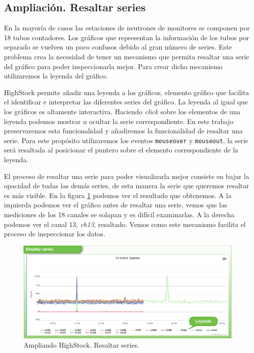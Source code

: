 	\subsection{Ampliación. Resaltar series}
		En la mayoría de casos las estaciones de neutrones de monitores se componen por 18 tubos contadores. Los gráficos que representan la
		información de los tubos por separado se vuelven un poco confusos debido al gran número de series. Este problema crea la necesidad de
		tener un mecanismo que permita resaltar una serie del gráfico para poder inspeccionarla mejor. Para crear dicho mecanismo utilizaremos
		la leyenda del gráfico.
		\par
		HighStock permite añadir una leyenda a los gráficos, elemento gráfico que facilita el identificar e interpretar las diferentes series
		del gráfico. La leyenda al igual que los gráficos es altamente interactiva. Haciendo \emph{click} sobre los elementos de una leyenda
		podemos mostrar u ocultar la serie correspondiente. En este trabajo preservaremos esta funcionalidad y añadiremos la funcionalidad de
		resaltar una serie. Para este propósito utilizaremos los eventos \texttt{mouseover} y \texttt{mouseout}, la serie será resaltada al
		posicionar el puntero sobre el elemento correspondiente de la leyenda. 
		\par
		El proceso de resaltar una serie para poder visualizarla mejor consiste en bajar la opacidad de todas las demás series, de esta manera
		la serie que queremos resaltar es más visible. En la figura \ref{fig:resalto} podemos ver el resultado que obtenemos. A la izquierda
		podemos ver el gráfico antes de resaltar una serie, vemos que las mediciones de los 18 canales se solapan y es difícil examinarlas. A
		la derecha podemos ver el canal 13, \emph{ch13}, resaltado. Vemos como este mecanismo facilita el proceso de inspeccionar los datos.
		\begin{figure}[h]
			\centering
			\includegraphics[keepaspectratio, width=1\textwidth]{./img/resalto.png}
			\caption{Ampliando HighStock. Resaltar series.}   
			\label{fig:resalto}
		\end{figure}

